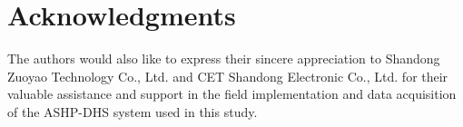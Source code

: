 \documentclass[journal]{IEEEtran}
\theoremstyle{remark}
\begin{document}
	\section*{Acknowledgments}
	The authors would also like to express their sincere appreciation to Shandong Zuoyao Technology Co., Ltd. and CET Shandong Electronic Co., Ltd. for their valuable assistance and support in the field implementation and data acquisition of the ASHP-DHS system used in this study.
	
	
	
	
	
	
	
	
\end{document}
